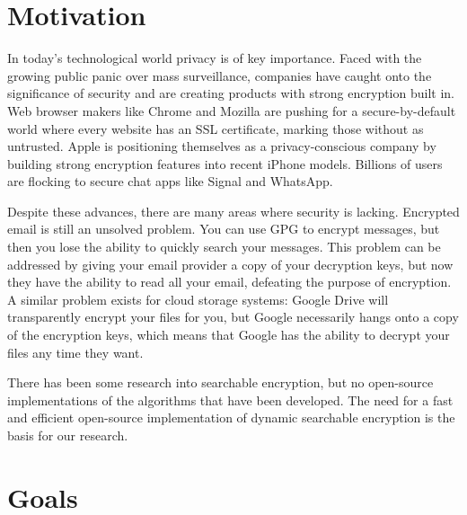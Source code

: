 \documentclass[onecolumn, draftclsnofoot,10pt, compsoc]{IEEEtran}
\begin{document}
\section{Motivation}


In today's technological world privacy is of key importance.
Faced with the growing public panic over mass surveillance,
companies have caught onto the significance of security and are creating products with strong encryption built in.
Web browser makers like Chrome and Mozilla are pushing for a secure-by-default world where every website has an SSL certificate, marking those without as untrusted.
Apple is positioning themselves as a privacy-conscious company by building strong encryption features into recent iPhone models.
Billions of users are flocking to secure chat apps like Signal and WhatsApp.

Despite these advances, there are many areas where security is lacking.
Encrypted email is still an unsolved problem.
You can use GPG to encrypt messages, but then you lose the ability to quickly search your messages.
This problem can be addressed by giving your email provider a copy of your decryption keys, but now they have the ability to read all your email, defeating the purpose of encryption.
A similar problem exists for cloud storage systems: Google Drive will transparently encrypt your files for you, but Google necessarily hangs onto a copy of the encryption keys, which means that Google has the ability to decrypt your files any time they want.


There has been some research into searchable encryption, but no open-source implementations of the algorithms that have been developed.
The need for a fast and efficient open-source implementation of dynamic searchable encryption is the basis for our research.



\section{Goals}
\end{document}

